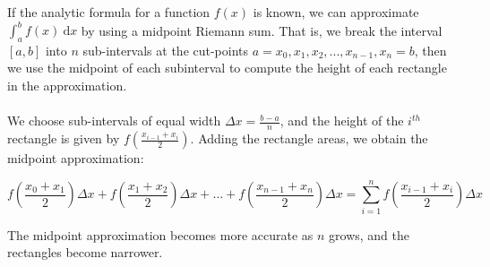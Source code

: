 \documentclass[10.5pt,twoside]{report}
\theoremstyle{definition}
\begin{document}
If the analytic formula for a function $f(x)$ is known, we can approximate $\displaystyle \int_a^b f(x)\ \mathrm{d}x$ by using a midpoint Riemann sum.  That is, we break the interval $[a,b]$ into $n$ sub-intervals at the cut-points $a=x_0,x_1,x_2,...,x_{n-1},x_n=b$, then we use the midpoint of each subinterval to compute the height of each rectangle in the approximation.\\
${}$\\
We choose sub-intervals of equal width $\Delta x = \frac{b-a}{n}$, and the height of the $i^{th}$ rectangle is given by $f\left( \frac{x_{i-1}+x_i}{2}\right)$.  Adding the rectangle areas, we obtain the midpoint approximation:

\[f\left( \frac{x_{0}+x_1}{2}\right) \Delta x + f\left( \frac{x_{1}+x_2}{2}\right) \Delta x + \dots + f\left( \frac{x_{n-1}+x_n}{2}\right) \Delta x = \sum_ {i=1}^{n} f\left( \frac{x_{i-1}+x_i}{2}\right) \Delta x\]

The midpoint approximation becomes more accurate as $n$ grows, and the rectangles become narrower.\\
\end{document}

